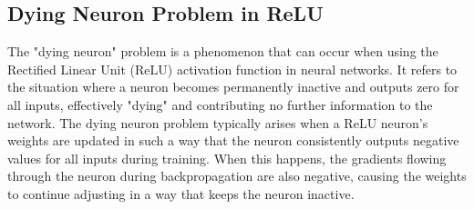 \documentclass[a4paper, noexaminfo]{sapthesis}
\begin{document}
  \subsection{Dying Neuron Problem in ReLU} \label{sec:dying-neuron}
  The "dying neuron" problem is a phenomenon that can occur when using 
  the Rectified Linear Unit (ReLU) activation function in neural networks. 
  It refers to the situation where a neuron becomes permanently inactive 
  and outputs zero for all inputs, effectively "dying" and contributing 
  no further information to the network.\newline
  The dying neuron problem typically arises when a ReLU neuron's weights 
  are updated in such a way that the neuron consistently outputs 
  negative values for all inputs during training. When this happens, 
  the gradients flowing through the neuron during backpropagation 
  are also negative, causing the weights to continue adjusting in a way 
  that keeps the neuron inactive.
\end{document}
